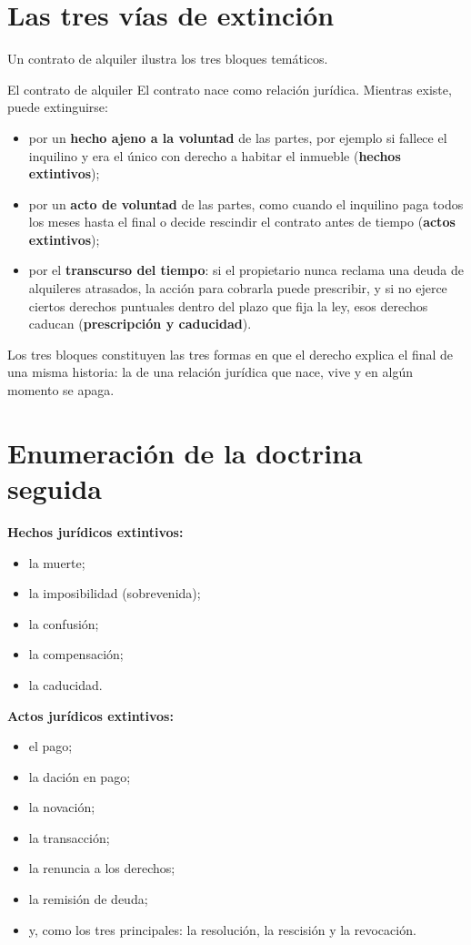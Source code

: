 \documentclass[12pt,oneside]{book}
\begin{document}
\section{Las tres vías de extinción}

Un contrato de alquiler ilustra los tres bloques temáticos.

\begin{example}{El contrato de alquiler}
El contrato nace como relación jurídica. Mientras existe, puede extinguirse:
\begin{itemize}
    \item por un \textbf{hecho ajeno a la voluntad} de las partes, por ejemplo si fallece el inquilino y era el único con derecho a habitar el inmueble (\textbf{hechos extintivos});
    \item por un \textbf{acto de voluntad} de las partes, como cuando el inquilino paga todos los meses hasta el final o decide rescindir el contrato antes de tiempo (\textbf{actos extintivos});
    \item por el \textbf{transcurso del tiempo}: si el propietario nunca reclama una deuda de alquileres atrasados, la acción para cobrarla puede prescribir, y si no ejerce ciertos derechos puntuales dentro del plazo que fija la ley, esos derechos caducan (\textbf{prescripción y caducidad}).
\end{itemize}
\end{example}

Los tres bloques constituyen las tres formas en que el derecho explica el final de una misma historia: la de una relación jurídica que nace, vive y en algún momento se apaga.

\section{Enumeración de la doctrina seguida}

\textbf{Hechos jurídicos extintivos:}
\begin{itemize}
    \item la muerte;
    \item la imposibilidad (sobrevenida);
    \item la confusión;
    \item la compensación;
    \item la caducidad.
\end{itemize}

\textbf{Actos jurídicos extintivos:}
\begin{itemize}
    \item el pago;
    \item la dación en pago;
    \item la novación;
    \item la transacción;
    \item la renuncia a los derechos;
    \item la remisión de deuda;
    \item y, como los tres principales: la resolución, la rescisión y la revocación.
\end{itemize}
\end{document}
